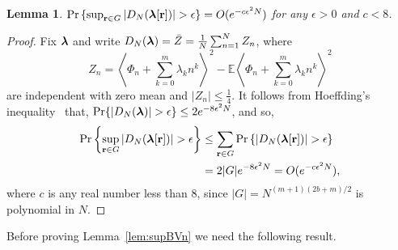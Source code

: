 \documentclass[aap,preprint]{imsart}
\newcommand{\prob}{\operatorname{Pr}}
\newcommand{\expect}{{\mathbb E}}
\newcommand{\fracpart}[1]{\left\langle #1 \right\rangle}
\newcommand{\abs}[1]{\left\vert #1 \right\vert}
\newcommand{\sabs}[1]{\vert #1 \vert}
\newtheorem{lemma}{Lemma}
\newcommand{\cubr}[1]{{\left\{ #1 \right\}}}
\newcommand{\scubr}[1]{{\{ #1 \}}}
\begin{document}


\begin{lemma}\label{lem:supVjk}
$\prob\cubr{   \sup_{\rbf \in G}\abs{ D_N(\lambdabf[\rbf])  } > \epsilon } = O(e^{-c \epsilon^2 N})$ for any $\epsilon > 0$ and $c < 8$.
\end{lemma}
 \begin{proof}
Fix $\boldsymbol{\lambda}$ and write $D_N(\boldsymbol{\lambda}) = \bar{Z} = \frac{1}{N}  \sum_{n=1}^{N}Z_{n}$, where
 \[
 Z_{n}=\fracpart{  \Phi_n+\sum_{k = 0}^{m}{\lambda_k n^k} }^{2} - \expect \fracpart{  \Phi_n + \sum_{k = 0}^{m}{\lambda_k n^k} }^{2}
 \]
 are independent with zero mean and $\abs{Z_n} \leq \tfrac{1}{4}$. It follows from Hoeffding's inequality~\cite{Hoeffding_inequality_1963} that,  $\prob\{ \abs{D_N(\lambdabf)} > \epsilon \} \leq 2e^{ - 8 \epsilon^2 N}$, and so,
 \begin{align*}
 \prob\cubr{  \sup_{\rbf\in G}\left\vert D_N(\lambdabf[\rbf]) \right\vert >\epsilon }  &\leq \sum_{\rbf \in G} \prob\scubr{  \left\vert D_N(\lambdabf[\rbf])  \right\vert >\epsilon } \nonumber \\
&= 2 |G| e^{ - 8 \epsilon^2 N} = O(e^{-c \epsilon^2 N}), \label{eq:betaprobconv}
\end{align*}
where $c$ is any real number less than $8$, since $|G| = N^{(m+1)(2b + m)/2}$ is polynomial in $N$.
\end{proof}

Before proving Lemma~\ref{lem:supBVn} we need the following result.
\end{document}
